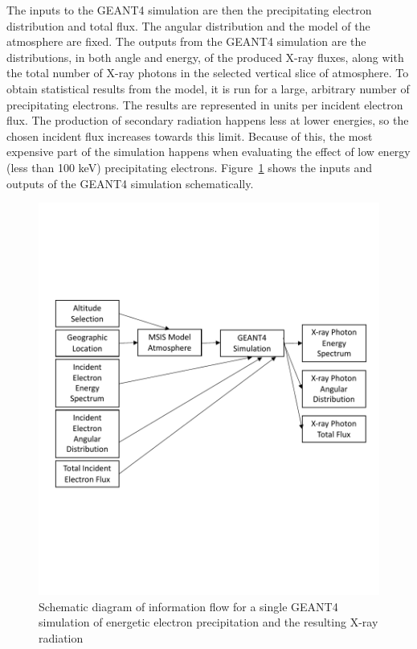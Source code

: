The inputs to the GEANT4 simulation are then the precipitating electron distribution and total flux. The angular distribution and the model of the atmosphere are fixed. The outputs from the GEANT4 simulation are the distributions, in both angle and energy, of the produced X-ray fluxes, along with the total number of X-ray photons in the selected vertical slice of atmosphere. To obtain statistical results from the model, it is run for a large, arbitrary number of precipitating electrons. The results are represented in units per incident electron flux. The production of secondary radiation happens less at lower energies, so the chosen incident flux increases towards this limit. Because of this, the most expensive part of the simulation happens when evaluating the effect of low energy (less than 100 keV) precipitating electrons. Figure~\ref{geant4_io_schematic} shows the inputs and outputs of the GEANT4 simulation schematically. 

\begin{figure}[p]
\label{geant4_io_schematic}
\includegraphics[width=1.0\textwidth]{figures/chapter_3/geant4_io_schematic/geant4_io_schematic}
\caption{Schematic diagram of information flow for a single GEANT4 simulation of energetic electron precipitation and the resulting X-ray radiation}
\end{figure}

